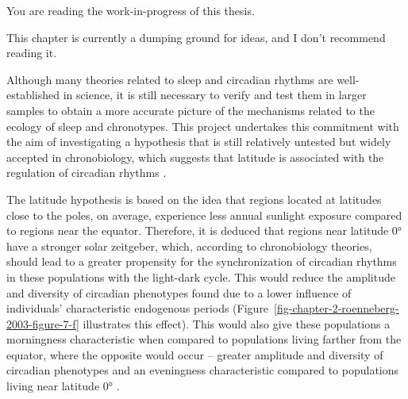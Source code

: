 \documentclass[
12pt,
openright,
oneside,
a4paper,
chapter=TITLE,
section=TITLE,
french,
spanish,
brazil,
english
]{abntex2}\usepackage{array}
\newcommand{\microskip}{\vspace{\microskipamount}}
\begin{document}
\begin{tcolorbox}[enhanced jigsaw, opacitybacktitle=0.6, titlerule=0mm, coltitle=black, bottomtitle=1mm, breakable, rightrule=.15mm, left=2mm, title=\textcolor{quarto-callout-important-color}{\faExclamation}\hspace{0.5em}{Important}, opacityback=0, colbacktitle=quarto-callout-important-color!10!white, toprule=.15mm, toptitle=1mm, leftrule=.75mm, colback=white, bottomrule=.15mm, arc=.35mm, colframe=quarto-callout-important-color-frame]

You are reading the work-in-progress of this thesis.

\microskip

This chapter is currently a dumping ground for ideas, and I don't
recommend reading it.

\end{tcolorbox}

Although many theories related to sleep and circadian rhythms are
well-established in science, it is still necessary to verify and test
them in larger samples to obtain a more accurate picture of the
mechanisms related to the ecology of sleep and chronotypes. This project
undertakes this commitment with the aim of investigating a hypothesis
that is still relatively untested but widely accepted in chronobiology,
which suggests that latitude is associated with the regulation of
circadian rhythms
\autocite{hut2013,leocadio-miguel2014,leocadio-miguel2017,pittendrigh1991,randler2008,randler2017,roenneberg2003}.

The latitude hypothesis is based on the idea that regions located at
latitudes close to the poles, on average, experience less annual
sunlight exposure compared to regions near the equator. Therefore, it is
deduced that regions near latitude 0° have a stronger solar zeitgeber,
which, according to chronobiology theories, should lead to a greater
propensity for the synchronization of circadian rhythms in these
populations with the light-dark cycle. This would reduce the amplitude
and diversity of circadian phenotypes found due to a lower influence of
individuals' characteristic endogenous periods
(Figure~\ref{fig-chapter-2-roenneberg-2003-figure-7-f} illustrates this
effect). This would also give these populations a morningness
characteristic when compared to populations living farther from the
equator, where the opposite would occur -- greater amplitude and
diversity of circadian phenotypes and an eveningness characteristic
compared to populations living near latitude 0°
\autocite{roenneberg2003}.
\end{document}
